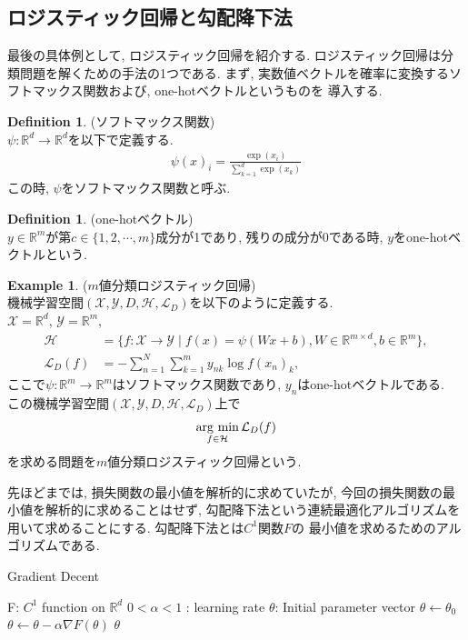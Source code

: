\documentclass[11pt, a4paper, dvipdfmx]{jsarticle}
\theoremstyle{definition}
\newtheorem{Definition+}[Axiom+]{Definition}
\newtheorem{Example+}[Axiom+]{Example}
\newcommand{\R}{\mathbb{R}}
\newcommand{\X}{\mathcal{X}}
\newcommand{\Y}{\mathcal{Y}}
\newcommand{\Hil}{\mathcal{H}}
\newcommand{\Loss}{\mathcal{L}_{D}}
\newcommand{\MLsp}{(\X, \Y, D, \Hil, \Loss)}
\newcommand{\argmin}{\mathop{\rm arg~min}\limits}
\begin{document}
\subsection{ロジスティック回帰と勾配降下法}
最後の具体例として, ロジスティック回帰を紹介する. 
ロジスティック回帰は分類問題を解くための手法の1つである.
まず, 実数値ベクトルを確率に変換するソフトマックス関数および, one-hotベクトルというものを
導入する. 
\begin{Definition+}(ソフトマックス関数)\\
    $\psi:\R^d\to\R^d$を以下で定義する.
    \begin{align*}
        \psi(x)_{i} = \frac{\exp(x_i)}{\sum_{k = 1}^d\exp(x_k)}
    \end{align*}
    この時, $\psi$をソフトマックス関数と呼ぶ.
\end{Definition+}
\begin{Definition+}(one-hotベクトル)\\
    $y\in\R^m$が第$c\in\{1, 2, \cdots, m\}$成分が1であり, 残りの成分が0である時, 
    $y$をone-hotベクトルという.
\end{Definition+}
\begin{Example+}($m$値分類ロジスティック回帰)\\
    機械学習空間$\MLsp$を以下のように定義する.\\
    $\X=\R^d$, $\Y = \R^m$, 
    \begin{align*}
        \Hil &= \{f:\X\to\Y\mid f(x) = \psi(Wx + b), W\in\R^{m\times d}, b\in\R^m\},\\
        \Loss(f) &= -\sum_{n = 1}^{N}\sum_{k = 1}^{m}y_{nk}\log f(x_n)_{k},
    \end{align*}
    ここで$\psi:\R^m\to\R^m$はソフトマックス関数であり, $y_{n}$はone-hotベクトルである.\\
    この機械学習空間$\MLsp$上で
    \begin{align*}
        \argmin_{f\in\Hil}\Loss(f)
    \end{align*}
    を求める問題を$m$値分類ロジスティック回帰という.
\end{Example+}
先ほどまでは, 損失関数の最小値を解析的に求めていたが, 今回の損失関数の最小値を解析的に求めることはせず,
勾配降下法という連続最適化アルゴリズムを用いて求めることにする. 勾配降下法とは$C^{1}$関数$F$の
最小値を求めるためのアルゴリズムである.
\begin{algorithm}[H]
    \caption{Gradient Decent}
    \begin{algorithmic}
        \REQUIRE F: $C^1$ function on $\R^{d}$
        \REQUIRE $0<\alpha<1$ : learning rate 
        \REQUIRE $\theta$: Initial parameter vector
        \STATE $\theta\leftarrow\theta_{0}$
        \STATE $\theta\leftarrow\theta - \alpha\nabla F(\theta)$ 
        \ENDWHILE
        \RETURN $\theta$
    \end{algorithmic}
\end{algorithm}
\end{document}
